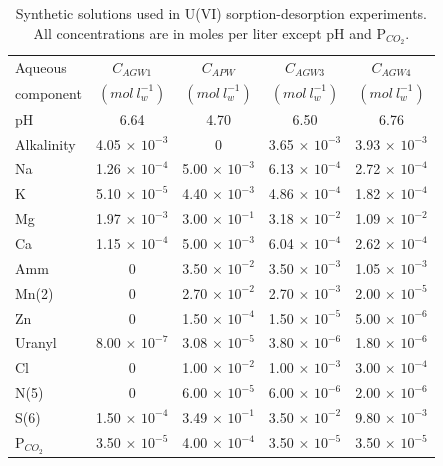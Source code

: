 \begin{table}[hb]
\caption{Synthetic solutions used in U(VI) sorption-desorption experiments.  
All concentrations are in moles per liter except pH and P$_{CO_2}$.}
\begin{center}
\begin{tabular}{l c c c c}
\hline
 Aqueous       & $C_{AGW1}$              & $C_{APW}$               & $C_{AGW3}$              & $C_{AGW4}$ \\
 component     & $(mol\ l^{-1}_w)$       & $(mol\ l^{-1}_w)$       &   $(mol\ l^{-1}_w)$     & $(mol\ l^{-1}_w)$ \\ \hline
 pH            &   6.64                  &  4.70                   & 6.50                    & 6.76 \\
 Alkalinity    & 4.05 $\times$ $10^{-3}$ & 0                       & 3.65 $\times$ $10^{-3}$ & 3.93 $\times$ $10^{-3}$ \\ 
 Na            & 1.26 $\times$ $10^{-4}$ & 5.00 $\times$ $10^{-3}$ & 6.13 $\times$ $10^{-4}$ & 2.72 $\times$ $10^{-4}$ \\ 
 K             & 5.10 $\times$ $10^{-5}$ & 4.40 $\times$ $10^{-3}$ & 4.86 $\times$ $10^{-4}$ & 1.82 $\times$ $10^{-4}$ \\ 
 Mg            & 1.97 $\times$ $10^{-3}$ & 3.00 $\times$ $10^{-1}$ & 3.18 $\times$ $10^{-2}$ & 1.09 $\times$ $10^{-2}$ \\
 Ca            & 1.15 $\times$ $10^{-4}$ & 5.00 $\times$ $10^{-3}$ & 6.04 $\times$ $10^{-4}$ & 2.62 $\times$ $10^{-4}$ \\
 Amm           & 0                       & 3.50 $\times$ $10^{-2}$ & 3.50 $\times$ $10^{-3}$ & 1.05 $\times$ $10^{-3}$ \\
 Mn(2)         & 0                       & 2.70 $\times$ $10^{-2}$ & 2.70 $\times$ $10^{-3}$ & 2.00 $\times$ $10^{-5}$ \\
 Zn            & 0                       & 1.50 $\times$ $10^{-4}$ & 1.50 $\times$ $10^{-5}$ & 5.00 $\times$ $10^{-6}$ \\
 Uranyl        & 8.00 $\times$ $10^{-7}$ & 3.08 $\times$ $10^{-5}$ & 3.80 $\times$ $10^{-6}$ & 1.80 $\times$ $10^{-6}$ \\
 Cl            &  0                      & 1.00 $\times$ $10^{-2}$ & 1.00 $\times$ $10^{-3}$ & 3.00 $\times$ $10^{-4}$ \\
 N(5)          &  0                      & 6.00 $\times$ $10^{-5}$ & 6.00 $\times$ $10^{-6}$ & 2.00 $\times$ $10^{-6}$ \\ 
 S(6)          & 1.50 $\times$ $10^{-4}$ & 3.49 $\times$ $10^{-1}$ & 3.50 $\times$ $10^{-2}$ & 9.80 $\times$ $10^{-3}$ \\
 P$_{CO_2}$    & 3.50 $\times$ $10^{-5}$ & 4.00 $\times$ $10^{-4}$ & 3.50 $\times$ $10^{-5}$ & 3.50 $\times$ $10^{-5}$ \\ \hline
\end{tabular}
\label{ex_u_scm}
\end{center}
\end{table}

